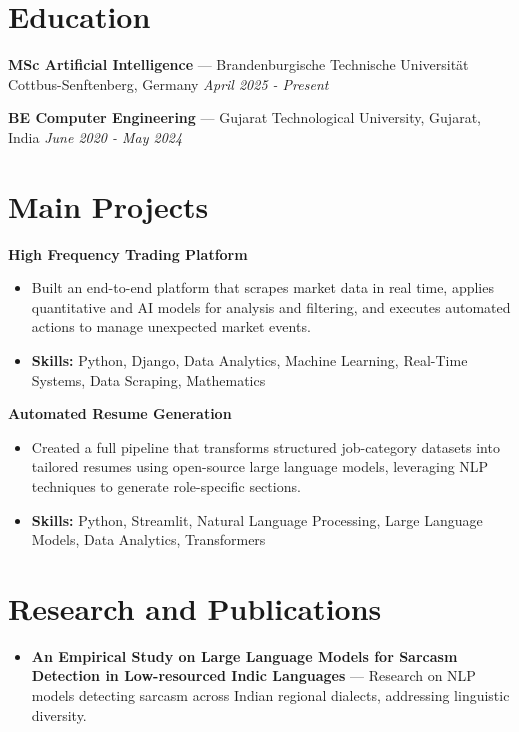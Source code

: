 \documentclass[a4paper,10pt]{article}
\begin{document}
\section*{Education}
\textbf{MSc Artificial Intelligence} — Brandenburgische Technische Universität Cottbus-Senftenberg, Germany \hfill \textit{April 2025 - Present}\par
\vspace{1.5pt}
\textbf{BE Computer Engineering} — Gujarat Technological University, Gujarat, India \hfill \textit{June 2020 - May 2024}\par

\section*{Main Projects}
\textbf{High Frequency Trading Platform}\par
\vspace{1pt}
\begin{itemize}
  \item Built an end-to-end platform that scrapes market data in real time, applies quantitative and AI models for analysis and filtering, and executes automated actions to manage unexpected market events.
  \item \textbf{Skills:} Python, Django, Data Analytics, Machine Learning, Real-Time Systems, Data Scraping, Mathematics
\end{itemize}
\vspace{3pt}
\textbf{Automated Resume Generation}\par
\vspace{1pt}
\begin{itemize}
  \item Created a full pipeline that transforms structured job-category datasets into tailored resumes using open-source large language models, leveraging NLP techniques to generate role-specific sections.
  \item \textbf{Skills:} Python, Streamlit, Natural Language Processing, Large Language Models, Data Analytics, Transformers
\end{itemize}

\section*{Research and Publications}
\begin{itemize}
\item \textbf{An Empirical Study on Large Language Models for Sarcasm Detection in Low-resourced Indic Languages} — Research on NLP models detecting sarcasm across Indian regional dialects, addressing linguistic diversity.
\end{itemize}
\end{document}
